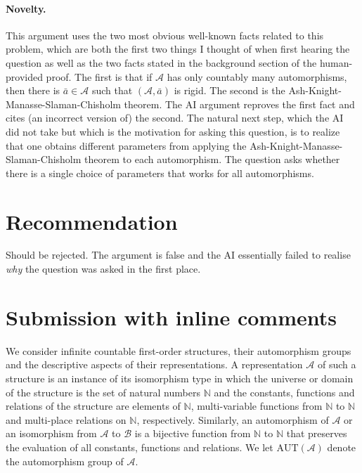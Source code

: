 \documentclass[12pt]{article}
\newcommand{\A}{\mathcal{A}}
\newcommand{\B}{\mathcal{B}}
\newcommand{\N}{\mathbb{N}}
\newcommand{\AUT}{\mathrm{AUT}}
\begin{document}
\paragraph{Novelty.} This argument uses the two most obvious well-known facts related to this problem, which are both the first two things I thought of when first hearing the question as well as the two facts stated in the background section of the human-provided proof. The first is that if $\mathcal{A}$ has only countably many automorphisms, then there is $\bar{a} \in \mathcal{A}$ such that $(\mathcal{A},\bar{a})$ is rigid. The second is the Ash-Knight-Manasse-Slaman-Chisholm theorem. The AI argument reproves the first fact and cites (an incorrect version of) the second. The natural next step, which the AI did not take but which is the motivation for asking this question, is to realize that one obtains different parameters from applying the Ash-Knight-Manasse-Slaman-Chisholm theorem to each automorphism. The question asks whether there is a single choice of parameters that works for all automorphisms.


\section{Recommendation}

Should be rejected. The argument is false and the AI essentially failed to realise \textit{why} the question was asked in the first place.

  \section{Submission with inline comments}


\date{}


We consider infinite countable first-order structures, their automorphism groups and the descriptive aspects of their representations. A representation $\A$ of such a structure is an instance of its isomorphism type in which the universe or domain of the structure is the set of natural numbers $\N$ and the constants, functions and relations of the structure are elements of $\N$, multi-variable functions from $\N$ to $\N$ and multi-place relations on $\N$, respectively.   Similarly, an automorphism of $\A$ or an isomorphism from $\A$ to $\B$ is a bijective function from $\N$ to $\N$ that preserves the evaluation of all constants, functions and relations.  We let $\AUT(\A)$ denote the automorphism group of $\A$.
\end{document}
